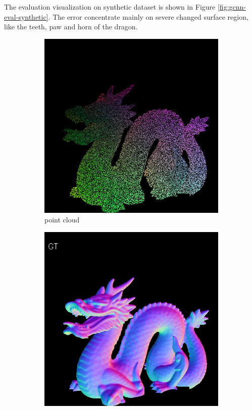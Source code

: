 The evaluation visualization on synthetic dataset is shown in Figure \ref{fig:gcnn-eval-synthetic}. The error concentrate mainly on severe changed surface region, like the teeth, paw and horn of the dragon.
\begin{figure}[h!]
	\centering
	\begin{subfigure}[b]{0.24\linewidth}
		\includegraphics[width=\linewidth]{./Figures/gcnn-synthetic/fancy_eval_3_point_cloud_noise.png}
		\caption{point cloud}
	\end{subfigure}
	\begin{subfigure}[b]{0.24\linewidth}
		\includegraphics[width=\linewidth]{./Figures/gcnn-synthetic/fancy_eval_3_groundtruth.png}

\end{subfigure}
\end{figure}
